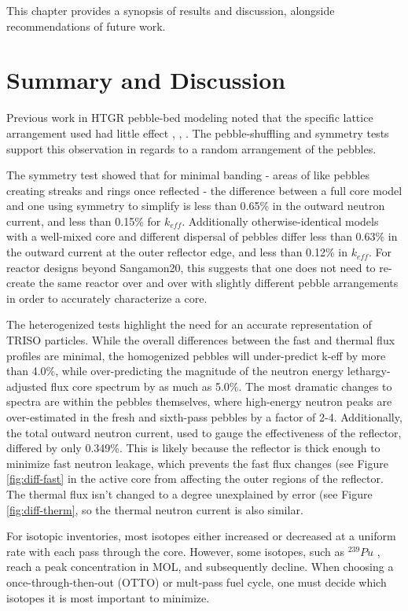 This chapter provides a synopsis of results and discussion, alongside recommendations of future work.

\section{Summary and Discussion}

Previous work in HTGR pebble-bed modeling noted that the specific lattice arrangement used had little effect \cite{turkmen_effect_2012}, \cite{karriem_mcnp_2001}, \cite{brown_stochastic_2005}.  The pebble-shuffling and symmetry tests support this observation in regards to a  random arrangement of the pebbles.

The symmetry test showed that for minimal banding - areas of like pebbles creating streaks and rings once reflected - the difference between a full core model and one using symmetry to simplify is less than 0.65\% in the outward neutron current, and less than 0.15\% for $k_{eff}$.  Additionally otherwise-identical models with a well-mixed core and different dispersal of pebbles differ less than 0.63\% in the outward current at the outer reflector edge, and less than 0.12\% in $k_{eff}$.  For reactor designs beyond Sangamon20, this suggests that one does not need to re-create the same reactor over and over with slightly different pebble arrangements in order to accurately characterize a core.

The heterogenized tests highlight the need for an accurate representation of TRISO particles.  While the overall differences between the fast and thermal flux profiles are minimal, the homogenized pebbles will under-predict k-eff by more than 4.0\%, while over-predicting the magnitude of the neutron energy lethargy-adjusted flux core spectrum by as much as 5.0\%.  The most dramatic changes to spectra are within the pebbles themselves, where high-energy neutron peaks are over-estimated in the fresh and sixth-pass pebbles by a factor of 2-4.  Additionally, the total outward neutron current, used to gauge the effectiveness of the reflector, differed by only 0.349\%.  This is likely because the reflector is thick enough to minimize fast neutron leakage, which prevents the fast flux changes (see Figure \ref{fig:diff-fast} in the active core from affecting the outer regions of the reflector. The thermal flux isn't changed to a degree unexplained by error (see Figure \ref{fig:diff-therm}, so the thermal neutron current is also similar.

For isotopic inventories, most isotopes either increased or decreased at a uniform rate with each pass through the core.  However, some isotopes, such as $^{239}Pu$ , reach a peak concentration in MOL, and subsequently decline.  When choosing a once-through-then-out (OTTO) or mult-pass fuel cycle, one must decide which isotopes it is most important to minimize.


